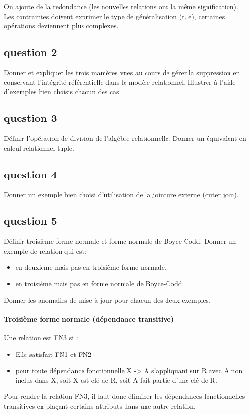 On ajoute de la redondance (les nouvelles relations ont la m\^eme signification).
Les contraintes doivent exprimer le type de généralisation (t, e), 
certaines opérations deviennent plus complexes.


\subsection{question 2}
	Donner et expliquer les trois manières vues au cours de gérer la suppression en conservant l'intégrité référentielle dans le modèle relationnel. Illustrer à l'aide d'exemples bien choisis chacun des cas.



\subsection{question 3}
	Définir l'opération de division de l'algèbre relationnelle. Donner un équivalent en calcul relationnel tuple.
	
	
	
\subsection{question 4}
Donner un exemple bien choisi d’utilisation de la jointure externe (outer join).



\subsection{question 5}
Définir troisième forme normale et forme normale de Boyce-Codd.
Donner un exemple de relation qui est:
\begin{itemize}
	\item en deuxième mais pas en troisième forme normale,
	\item en troisième mais pas en forme normale de Boyce-Codd.
\end{itemize}
Donner les anomalies de mise à jour pour chacun des deux exemples.

\paragraph{Troisième forme normale (dépendance transitive)}
Une relation est FN3 si :
\begin{itemize}
	\item Elle satisfait FN1 et FN2
	\item pour toute dépendance fonctionnelle X -> A s'appliquant sur R avec A non inclus dans X, soit X est clé de R, soit A fait partie d'une clé de R.
\end{itemize}
Pour rendre la relation FN3, il faut donc éliminer les dépendances fonctionnelles transitives en plaçant certains attributs dans une autre relation.

